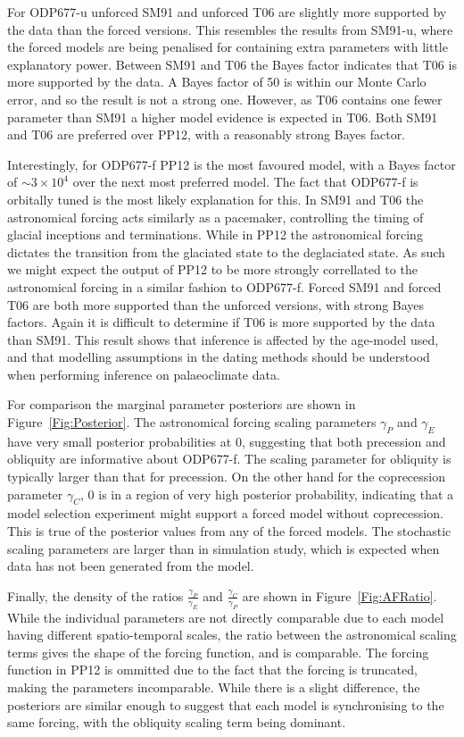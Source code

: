 \documentclass[a4paper,12pt]{article}
\begin{document}
For ODP677-u unforced SM91 and unforced T06 are slightly more supported by the data than the forced versions.
This resembles the results from SM91-u, where the forced models are being penalised for containing extra parameters with little explanatory power.
Between SM91 and T06 the Bayes factor indicates that T06 is more supported by the data.
A Bayes factor of 50 is within our Monte Carlo error, and so the result is not a strong one.
However, as T06 contains one fewer parameter than SM91 a higher model evidence is expected in T06.
Both SM91 and T06 are preferred over PP12, with a reasonably strong Bayes factor.

Interestingly, for ODP677-f PP12 is the most favoured model, with a Bayes factor of $\sim 3 \times 10^4$ over the next most preferred model.
The fact that ODP677-f is orbitally tuned is the most likely explanation for this.
In SM91 and T06 the astronomical forcing acts similarly as a pacemaker, controlling the timing of glacial inceptions and terminations. 
While in PP12 the astronomical forcing dictates the transition from the glaciated state to the deglaciated state.
As such we might expect the output of PP12 to be more strongly correllated to the astronomical forcing in a similar fashion to ODP677-f.
Forced SM91 and forced T06 are both more supported than the unforced versions, with strong Bayes factors.
Again it is difficult to determine if T06 is more supported by the data than SM91.
This result shows that inference is affected by the age-model used, and that modelling assumptions in the dating methods should be understood when performing inference on palaeoclimate data.

For comparison the marginal parameter posteriors are shown in Figure~\ref{Fig:Posterior}.
The astronomical forcing scaling parameters $\gamma_P$ and $\gamma_E$ have very small posterior probabilities at 0, suggesting that both precession and obliquity are informative about ODP677-f.
The scaling parameter for obliquity is typically larger than that for precession.
On the other hand for the coprecession parameter $\gamma_C$, 0 is in a region of very high posterior probability, indicating that a model selection experiment might support a forced model without coprecession.
This is true of the posterior values from any of the forced models.
The stochastic scaling parameters are larger than in simulation study, which is expected when data has not been generated from the model.

Finally, the density of the ratios $\frac{\gamma_P}{\gamma_E}$ and $\frac{\gamma_C}{\gamma_P}$ are shown in Figure~\ref{Fig:AFRatio}.
While the individual parameters are not directly comparable due to each model having different spatio-temporal scales, the ratio between the astronomical scaling terms gives the shape of the forcing function, and is comparable.
The forcing function in PP12 is ommitted due to the fact that the forcing is truncated, making the parameters incomparable.
While there is a slight difference, the posteriors are similar enough to suggest that each model is synchronising to the same forcing, with the obliquity scaling term being dominant.
\end{document}

